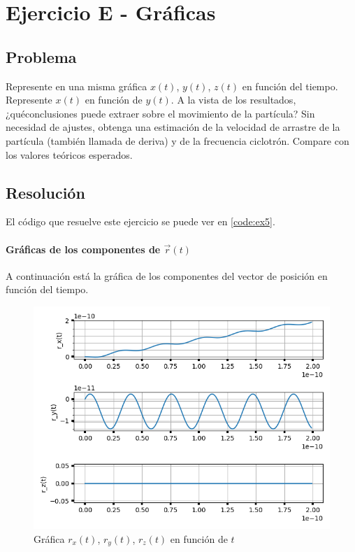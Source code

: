\section{Ejercicio E - Gráficas}

\subsection{Problema}

Represente en una misma gráfica $x(t)$, $y(t)$, $z(t)$ en función del tiempo. Represente $x(t)$ en función de $y(t)$. A la vista de los resultados, ¿quéconclusiones puede extraer sobre el movimiento de la partícula? Sin necesidad de ajustes, obtenga una estimación de la velocidad de arrastre de la partícula (también llamada de deriva) y de la frecuencia ciclotrón. Compare con los valores teóricos esperados.


\subsection{Resolución}

El código que resuelve este ejercicio se puede ver en \ref{code:ex5}.

\paragraph{Gráficas de los componentes de $\vec{r}(t)$}

A continuación está la gráfica de los componentes del vector de posición en función del tiempo.

\begin{figure}[H]
	\includegraphics[width=\linewidth]{figures/no_rel_rx_ry_rz.png}
	\caption{Gráfica $r_x(t)$, $r_y(t)$, $r_z(t)$ en función de $t$}
	\label{fig:no_rel_x_y_z_t}
\end{figure}


